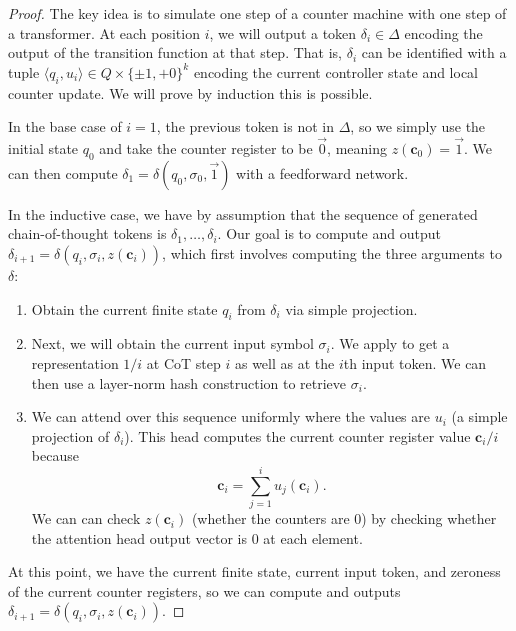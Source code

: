 \begin{proof}
The key idea is to simulate one step of a counter machine with one step of a transformer. At each position $i$, we will output a token $\delta_i \in \Delta$ encoding the output of the transition function at that step. That is, $\delta_i$ can be identified with a tuple $\langle q_i, u_i \rangle \in Q \times \{ {\pm} 1, {+}0 \}^k$ encoding the current controller state and local counter update. We will prove by induction this is possible.

In the base case of $i=1$, the previous token is not in $\Delta$, so we simply use the initial state $q_0$ and take the counter register to be $\vec 0$, meaning $z(\mathbf c_0) = \vec 1$. We can then compute $\delta_1 = \delta(q_0, \sigma_0, \vec 1)$ with a feedforward network.

In the inductive case, we have by assumption that the sequence of generated chain-of-thought tokens is $\delta_1, \ldots, \delta_i$. Our goal is to compute and output $\delta_{i+1} = \delta(q_i, \sigma_i, z(\mathbf c_i))$, which first involves computing the three arguments to $\delta$:
\begin{enumerate}
    \item Obtain the current finite state $q_i$ from $\delta_i$ via simple projection.
    \item Next, we will obtain the current input symbol $\sigma_i$. We apply  to get a representation $1/i$ at CoT step $i$ as well as at the $i$th input token. We can then use a layer-norm hash construction to retrieve $\sigma_i$.
    \item We can attend over this sequence uniformly where the values are $u_i$ (a simple projection of $\delta_i$). This head computes the current counter register value $\mathbf c_i / i$ because
    \begin{equation*}
        \mathbf c_i = \sum_{j=1}^i u_j(\mathbf c_i) .
    \end{equation*}
    We can can check $z(\mathbf c_i)$ (whether the counters are $0$) by checking whether the attention head output vector is $0$ at each element.
\end{enumerate}
At this point, we have the current finite state, current input token, and zeroness of the current counter registers, so we can compute and outputs $\delta_{i+1} = \delta(q_i, \sigma_i, z(\mathbf c_i))$.
\end{proof}